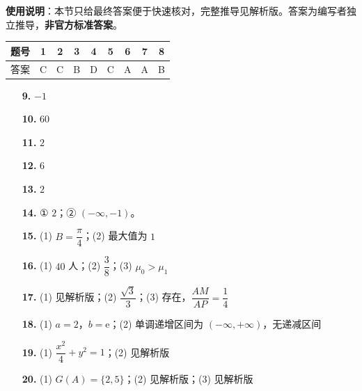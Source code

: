 
\begin{gknotice}
\textbf{使用说明}：本节只给最终答案便于快速核对，完整推导见解析版。答案为编写者独立推导，\textbf{非官方标准答案}。
\end{gknotice}

\begin{center}\begin{tabular}{ccccccccc}
\toprule
题号 & 1 & 2 & 3 & 4 & 5 & 6 & 7 & 8 \\
\midrule
答案 & C & C & B & D & C & A & A & B \\
\bottomrule
\end{tabular}\end{center}

\begin{itemize}[leftmargin=2.6em]
  \item[\textbf{9.}] \(-1\)
  \item[\textbf{10.}] \(60\)
  \item[\textbf{11.}] \(2\)
  \item[\textbf{12.}] \(6\)
  \item[\textbf{13.}] \(2\)
  \item[\textbf{14.}] ① \(2\)；② \((-\infty,-1)\)。
\end{itemize}

\begin{itemize}[leftmargin=2.6em]
  \item[\textbf{15.}] (1) \(B=\dfrac{\pi}{4}\)；(2) 最大值为 \(1\)
  \item[\textbf{16.}] (1) \(40\) 人；(2) \(\dfrac38\)；(3) \(\mu_0>\mu_1\)
  \item[\textbf{17.}] (1) 见解析版；(2) \(\dfrac{\sqrt3}{3}\)；(3) 存在，\(\dfrac{AM}{AP}=\dfrac14\)
  \item[\textbf{18.}] (1) \(a=2\)，\(b=\mathrm e\)；(2) 单调递增区间为 \((-\infty,+\infty)\)，无递减区间
  \item[\textbf{19.}] (1) \(\dfrac{x^2}{4}+y^2=1\)；(2) 见解析版
  \item[\textbf{20.}] (1) \(G(A)=\{2,5\}\)；(2) 见解析版；(3) 见解析版
\end{itemize}
